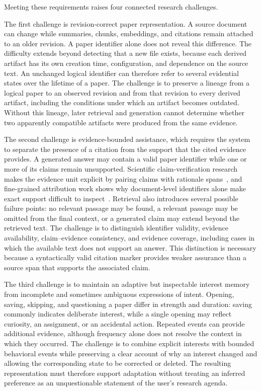 Meeting these requirements raises four connected research challenges.

The first challenge is revision-correct paper representation.
A source document can change while summaries, chunks, embeddings, and citations remain attached to an older revision.
A paper identifier alone does not reveal this difference.
The difficulty extends beyond detecting that a new file exists, because each derived artifact has its own creation time, configuration, and dependence on the source text.
An unchanged logical identifier can therefore refer to several evidential states over the lifetime of a paper.
The challenge is to preserve a lineage from a logical paper to an observed revision and from that revision to every derived artifact, including the conditions under which an artifact becomes outdated.
Without this lineage, later retrieval and generation cannot determine whether two apparently compatible artifacts were produced from the same evidence.

The second challenge is evidence-bounded assistance, which requires the system to separate the presence of a citation from the support that the cited evidence provides.
A generated answer may contain a valid paper identifier while one or more of its claims remain unsupported.
Scientific claim-verification research makes the evidence unit explicit by pairing claims with rationale spans~\cite{wadden2020scifact}, and fine-grained attribution work shows why document-level identifiers alone make exact support difficult to inspect~\cite{huang2024grounded}.
Retrieval also introduces several possible failure points: no relevant passage may be found, a relevant passage may be omitted from the final context, or a generated claim may extend beyond the retrieved text.
The challenge is to distinguish identifier validity, evidence availability, claim--evidence consistency, and evidence coverage, including cases in which the available text does not support an answer.
This distinction is necessary because a syntactically valid citation marker provides weaker assurance than a source span that supports the associated claim.

The third challenge is to maintain an adaptive but inspectable interest memory from incomplete and sometimes ambiguous expressions of intent.
Opening, saving, skipping, and questioning a paper differ in strength and duration: saving commonly indicates deliberate interest, while a single opening may reflect curiosity, an assignment, or an accidental action.
Repeated events can provide additional evidence, although frequency alone does not resolve the context in which they occurred.
The challenge is to combine explicit interests with bounded behavioral events while preserving a clear account of why an interest changed and allowing the corresponding state to be corrected or deleted.
The resulting representation must therefore support adaptation without treating an inferred preference as an unquestionable statement of the user's research agenda.

